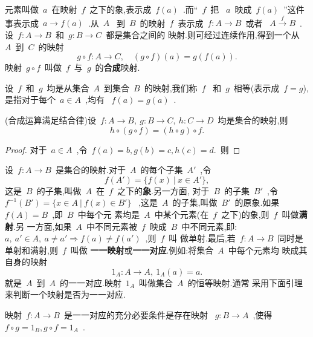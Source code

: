 元素叫做~$a$~在映射~$f$~之下的象,表示成~$f(a)$~.而“~$f$~把
~$a$~映成~$f(a)$~”这件事表示成~$a \rightarrow f(a)$~.从~$A$~
到~$B$~的映射~$f$~表示成~$f:A \rightarrow B$~或者
~$A \xrightarrow{f} B$~.
设~$f:A \rightarrow B$~和~$g:B \rightarrow C$~都是集合之间的
映射.则可经过连续作用,得到一个从~$A$~到~$C$~的映射
\begin{equation*}
    g \circ f:A \rightarrow C,\quad (g \circ f)(a)=g(f(a)).
\end{equation*}
映射~$g \circ f$~叫做~$f$~与~$g$~的\textbf{合成}映射.\par
设~$f$~和~$g$~均是从集合~$A$~到集合~$B$~的映射,我们称~$f$~
和~$g$~相等(表示成~$f=g$),是指对于每个~$a \in A$~,均有
~$f(a)=g(a)$~.\par
\begin{yinli}\label{yl:1.1.1}
    (合成运算满足结合律)设~$f:A \rightarrow B,~g:B 
    \rightarrow C,~h:C \rightarrow D$~均是集合的映射,则
    \begin{equation*}
h \circ (g \circ f)=(h \circ g) \circ f.
    \end{equation*}
\end{yinli}
\begin{proof}
    对于~$a \in A$~,令~$f(a)=b,g(b)=c,h(c)=d.$~则\par
    \par
\end{proof}\par
设~$f:A \rightarrow B$~是集合的映射.对于~$A$~的每个子集~$A'$~,令
\begin{equation*}
    f(A')=\{f(x)~|~x \in A'\},
\end{equation*}
这是~$B$~的子集,叫做~$A$~在~$f$~之下的\textbf{象}.另一方面,
对于~$B$~的子集~$B'$~,令~$f^{-1}(B')=\{x \in A~|~f(x) \in B'\}$~
,这是~$A$~的子集,叫做~$B'$~的原象.如果~$f(A)=B$~,即~$B$~中每个元
素均是~$A$~中某个元素(在~$f$~之下)的象,则~$f$~叫做\textbf{满射}.另
一方面,如果~$A$~中不同元素被~$f$~映成~$B$~中不同元素,即:
~$a,~a' \in A,~a \neq a' \Rightarrow f(a) \neq f(a')$~,则~$f$~叫
做单射.最后,若~$f:A \rightarrow B$~同时是单射和满射,则~$f$~叫做
\textbf{一一映射}或\textbf{一一对应}.例如:将集合~$A$~中每个元素均
映成其自身的映射
\begin{equation*}
    1_A:A \rightarrow A,~1_A(a)=a.
\end{equation*}
就是~$A$~到~$A$~的一一对应.映射~$1_A$~叫做集合~$A$~的恒等映射.通常
采用下面引理来判断一个映射是否为一一对应.
\begin{yinli}\label{yl:1.1.2}
    映射~$f:A \rightarrow B$~是一一对应的充分必要条件是存在映射
    ~$g:B \rightarrow A$~,使得~$f \circ g=1_B,g \circ f=1_A$~.
\end{yinli}
